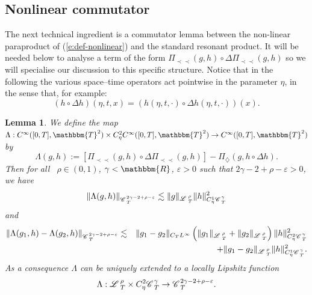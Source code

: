 \documentclass[11pt,reqno]{amsart}
\newcommand{\assign}{:=}
\newcommand{\precprec}{\prec\!\!\!\prec}
\newtheorem{lemma}[theorem]{Lemma}
\newcommand{\CC}{\mathscr{C} \hspace{.1em}}
\newcommand{\LL}{\mathscr{L} \hspace{.2em}}
\begin{document}
\subsection{Nonlinear commutator}

The next technical ingredient is a commutator lemma between the non-linear
paraproduct of (\ref{e:def-nonlinear}) and the standard resonant product. It
will be needed below to analyse a term of the form $\Pi_{\precprec} (g, h)
\circ \Delta \Pi_{\precprec} (g, h)$ so we will specialise our discussion to
this specific structure. Notice that in the following the various space--time
operators act pointwise in the parameter $\eta$, in the sense that, for
example:
\[ (h \circ \Delta h) (\eta, t, x) = (h (\eta, t, \cdot) \circ \Delta h (\eta,
   t, \cdot)) (x) . \]
\begin{lemma}
  \label{l:nonlin-comm}We define the map $\Lambda : C^{\infty} ([0, T],
  \mathbbm{T}^2) \times C_{\eta}^2 C^{\infty} ([0, T], \mathbbm{T}^2)
  \rightarrow C^{\infty} ([0, T], \mathbbm{T}^2)$ by
  \[ \Lambda (g, h) \assign [\Pi_{\precprec} (g, h) \circ \Delta
     \Pi_{\precprec} (g, h)] - \Pi_{\diamondsuit} (g, h \circ \Delta h) . \]
  Then for all \ $\rho \in (0, 1)$, $\gamma <\mathbbm{R}$, $\varepsilon > 0$
  such that $2 \gamma - 2 + \rho - \varepsilon > 0$, we have
  \[ \| \Lambda (g, h) \|_{\CC_T^{2 \gamma - 2 + \rho - \varepsilon}}
     \lesssim \| g \|_{\LL_T^{\rho}} \| h \|_{C^1_{\eta} \CC^{\gamma}_T}^2 \]
  and
  \begin{eqnarray*}
    \| \Lambda (g_1, h) - \Lambda (g_2, h) \|_{\CC_T^{2 \gamma - 2 + \rho -
    \varepsilon}} & \lesssim & \| g_1 - g_2 \|_{C_T L^{\infty}} \left( \| g_1
    \|_{\LL^{\rho}_T} + \| g_2 \|_{\LL^{\rho}_T} \right) \| h \|^2_{C_{\eta}^2
    \CC^{\gamma}_T}\\
    &  & + \| g_1 - g_2 \|_{\LL^{\rho}_T} \| h \|^2_{C_{\eta}^1
    \CC^{\gamma}_T} .
  \end{eqnarray*}
  As a consequence $\Lambda$ can be uniquely extended to a locally Lipshitz
  function
  \[ \Lambda : \LL^{\rho}_T \times C_{\eta}^2 \CC_T^{\gamma} \rightarrow
     \CC_T^{2 \gamma - 2 + \rho - \varepsilon} . \]
\end{lemma}
\end{document}
